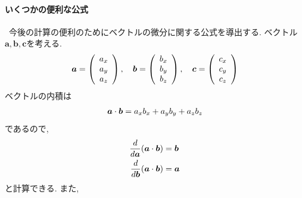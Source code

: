 \paragraph{いくつかの便利な公式} \
今後の計算の便利のためにベクトルの微分に関する公式を導出する. ベクトル$\bm{a}, \bm{b}, \bm{c}$を考える. 
\begin{align}
 \bm{a}= \left(
              \begin{array}{c}
               a_{x} \\
               a_{y} \\
               a_{z} 
              \end{array}
              \right)
 ,~~~
 \bm{b}= \left(
              \begin{array}{c}
               b_{x} \\
               b_{y} \\
               b_{z} 
              \end{array}
              \right)
 ,~~~
 \bm{c}= \left(
              \begin{array}{c}
               c_{x} \\
               c_{y} \\
               c_{z} 
              \end{array}
              \right)
\notag
\end{align}
ベクトルの内積は
\begin{align}
   \bm{a} \cdot \bm{b}
 =
   a_{x}b_{x} + a_{y}b_{y} + a_{z}b_{z} 
\notag
\end{align}
であるので, 
\begin{align}
 \frac{d}{d \bm{a}} (\bm{a} \cdot \bm{b}) &= \bm{b}
 \notag \\
 \frac{d}{d \bm{b}} (\bm{a} \cdot \bm{b}) &= \bm{a}
 \notag
\end{align}
と計算できる. 
また, 
